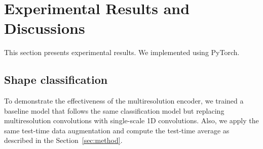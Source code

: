 \section{Experimental Results and Discussions}
This section presents experimental results. We implemented \mrtnet using PyTorch. 

\subsection{Shape classification} To demonstrate the effectiveness of the multiresolution encoder, we trained a baseline model that follows the same classification model but replacing multiresolution convolutions with single-scale 1D convolutions. Also, we apply the same test-time data augmentation and compute the test-time average as described in the Section~\ref{sec:method}. %


